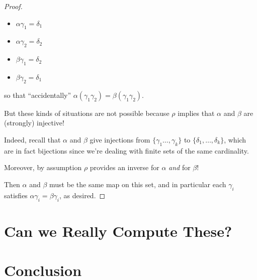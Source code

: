 \documentclass[12pt]{article}
\theoremstyle{definition}
\theoremstyle{theorem}
\begin{document}
\begin{proof}
    \begin{itemize}
        \item $\alpha \gamma_1 = \delta_1$
        \item $\alpha \gamma_2 = \delta_2$
        \item $\beta \gamma_1 = \delta_2$
        \item $\beta \gamma_2 = \delta_1$
    \end{itemize}

    so that ``accidentally'' $\alpha(\gamma_1 \gamma_2) = \beta(\gamma_1 \gamma_2)$.

    But these kinds of situations are not possible because $\rho$ implies that
    $\alpha$ and $\beta$ are (strongly) injective!

    Indeed, recall that $\alpha$ and $\beta$ give injections from $\{ \gamma_1 \ldots, \gamma_k \}$
    to $\{ \delta_1, \ldots, \delta_k \}$, which are in fact bijections since we're
    dealing with finite sets of the same cardinality. 

    Moreover, by assumption $\rho$ provides an inverse for $\alpha$ \emph{and} 
    for $\beta$!

    Then $\alpha$ and $\beta$ must be the same map on this set, and in particular
    each $\gamma_i$ satisfies $\alpha \gamma_i = \beta \gamma_i$, as desired.
\end{proof}

\section{Can we Really Compute These?}
\label{computing}

\section{Conclusion}
\label{conclusion}


\newpage
\nocite{*}


\end{document}
